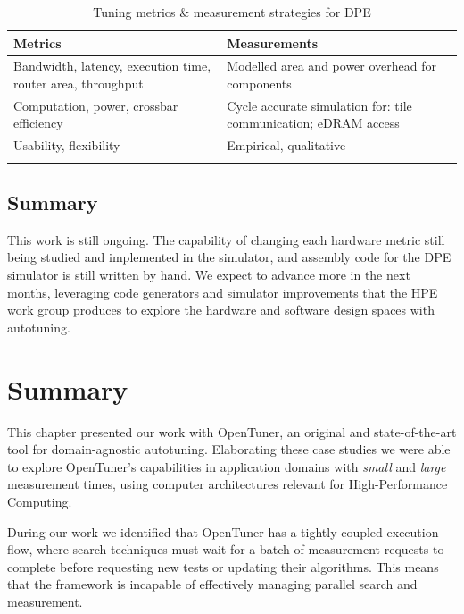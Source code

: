 \begin{table}[htpb]
\centering
\begin{tabular}{@{}p{}p{}@{}}
\toprule
\textbf{Metrics} & \textbf{Measurements} \\ \midrule
Bandwidth, latency, execution time, router area, throughput & Modelled area and power overhead for components \\
\addlinespace
Computation, power, crossbar efficiency & Cycle accurate simulation for: tile communication; eDRAM access \\
\addlinespace
Usability, flexibility & Empirical, qualitative \\ \bottomrule
\addlinespace
\end{tabular}
\caption{Tuning metrics \& measurement strategies for DPE}
\label{tab:metrics-measurements}
\end{table}


\subsection{Summary}
\label{subsec:DPEconcl}

This work is still ongoing. The capability of changing each hardware metric
still being studied and implemented in the simulator, and assembly code for the
DPE simulator is still written by hand. We expect to advance more in the next
months, leveraging code generators and simulator improvements that the HPE work
group produces to explore the hardware and software design spaces with
autotuning.

\section{Summary}

This chapter presented our work with OpenTuner, an original and
state-of-the-art tool for domain-agnostic autotuning. Elaborating these case
studies we were able to explore OpenTuner's capabilities in application domains
with \textit{small} and \textit{large} measurement times, using computer
architectures relevant for High-Performance Computing.

During our work we identified that OpenTuner has a tightly coupled
execution flow, where search techniques must wait for a batch of measurement
requests to complete before requesting new tests or updating their algorithms.
This means that the framework is incapable of effectively managing parallel
search and measurement.

